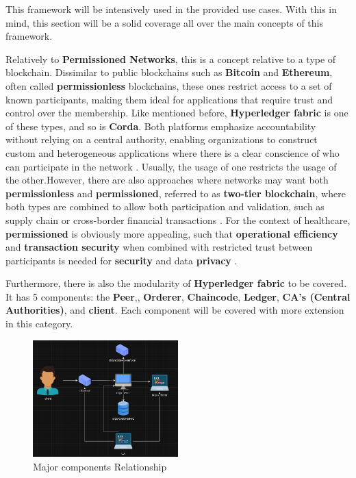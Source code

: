 This framework will be intensively used in the provided use cases. With this in mind, this section will be a solid coverage all over the main concepts of this framework.

Relatively to \textbf{Permissioned Networks}, this is a concept relative to a type of blockchain. Dissimilar to public blockchains such as \textbf{Bitcoin} and \textbf{Ethereum}, often called \textbf{permissionless} blockchains, these ones restrict access to a set of known participants, making them ideal for applications that require trust and control over the membership. Like mentioned before, \textbf{Hyperledger fabric} is one of these types, and so is \textbf{Corda}. Both platforms emphasize accountability without relying on a central authority, enabling organizations to construct custom and heterogeneous applications where there is a clear conscience of who can participate in the network \cite{permissioned-blockchains}. Usually, the usage of one restricts the usage of the other.However, there are also approaches where networks may want both \textbf{permissionless} and \textbf{permissioned}, referred to as \textbf{two-tier blockchain}, where both types are combined to allow both participation and validation, such as supply chain or cross-border financial transactions \cite{two-tier-permission-blockchains}. For the context of healthcare, \textbf{permissioned} is obviously more appealing, such that \textbf{operational efficiency} and \textbf{transaction security} when combined with restricted trust between participants is needed for \textbf{security} and data \textbf{privacy} \cite{permissioned-vs-permissionless-tradeoffs}.

Furthermore, there is also the modularity of \textbf{Hyperledger fabric} to be covered. It has 5 components: the \textbf{Peer},, \textbf{Orderer}, \textbf{Chaincode}, \textbf{Ledger}, \textbf{CA's (Central Authorities)}, and \textbf{client}. Each component will be covered with more extension in this category.

\begin{figure}[H]
    \centering
    \includegraphics[width=0.5\textwidth]{assets/tools/hyperledger/hlf-minimal-setup.png} %
    \caption{Major components Relationship}
    \label{fig:sample-image} 
\end{figure}

